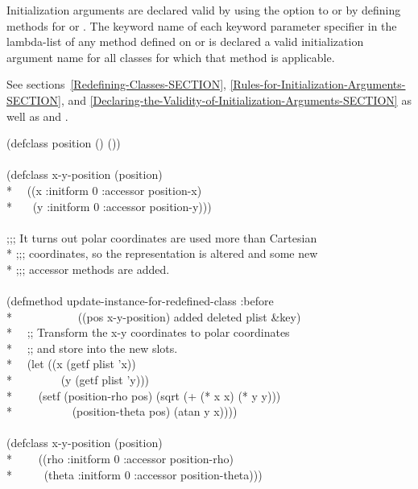 \begin{defun}
Initialization arguments are declared valid by using the 
 option to  or by defining methods for 
 or .  The
keyword name of each keyword parameter specifier in the lambda-list of
any method defined on  or 
 is declared a valid initialization argument name
for all classes for which that method is applicable.


See sections~\ref{Redefining-Classes-SECTION},
\ref{Rules-for-Initialization-Arguments-SECTION}, and
\ref{Declaring-the-Validity-of-Initialization-Arguments-SECTION} as well as
 and .


\begin{lisp}
(defclass position () ()) \\
\\
(defclass x-y-position (position) \\*
~~((x :initform 0 :accessor position-x) \\*
~~~(y :initform 0 :accessor position-y))) \\
\\
;;; It turns out polar coordinates are used more than Cartesian  \\*
;;; coordinates, so the representation is altered and some new \\*
;;; accessor methods are added. \\
\\
(defmethod update-instance-for-redefined-class :before \\*
~~~~~~~~~~~((pos x-y-position) added deleted plist \&key) \\*
~~;; Transform the x-y coordinates to polar coordinates \\*
~~;; and store into the new slots. \\*
~~(let ((x (getf plist 'x)) \\*
~~~~~~~~(y (getf plist 'y))) \\*
~~~~(setf (position-rho pos) (sqrt (+ (* x x) (* y y))) \\*
~~~~~~~~~~(position-theta pos) (atan y x)))) \\
\\
(defclass x-y-position (position) \\*
~~~~((rho :initform 0 :accessor position-rho) \\*
~~~~~(theta :initform 0 :accessor position-theta)))
\end{lisp}

\end{defun}

